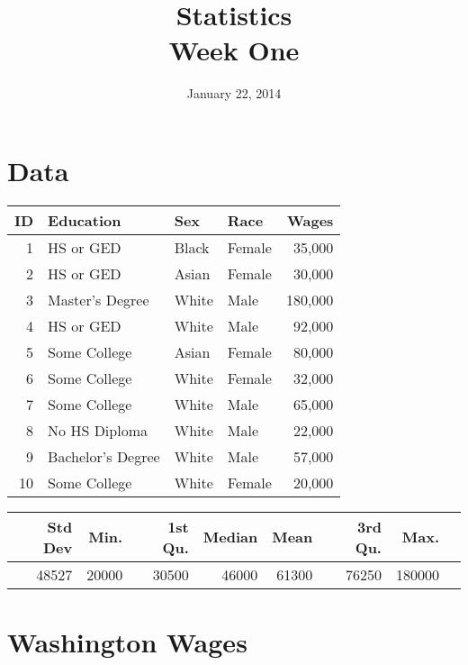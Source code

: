 \documentclass{exam}
\author{}
\date{January 22, 2014}
\title{Statistics \\ Week One}
\begin{document}
  \maketitle
  \tableofcontents

  \section{Data}

  \begin{table}[ht]
    \centering
    \begin{tabular}{rlllr}
      \toprule
        ID & Education         & Sex   & Race   & Wages \\
      \midrule
         1 & HS or GED         & Black & Female & 35,000 \\
         2 & HS or GED         & Asian & Female & 30,000 \\
         3 & Master's Degree   & White & Male   & 180,000 \\
         4 & HS or GED         & White & Male   & 92,000 \\
         5 & Some College      & Asian & Female & 80,000 \\
         6 & Some College      & White & Female & 32,000 \\
         7 & Some College      & White & Male   & 65,000 \\
         8 & No HS Diploma     & White & Male   & 22,000 \\
         9 & Bachelor's Degree & White & Male   & 57,000 \\
        10 & Some College      & White & Female & 20,000 \\
      \bottomrule
    \end{tabular}
  \end{table}

  \begin{table}[ht]
    \centering
    \begin{tabular}{rrrrrrrr}
      \toprule
        Std Dev & Min.  & 1st Qu. & Median & Mean  & 3rd Qu. & Max. \\
      \midrule
        48527   & 20000 & 30500   & 46000  & 61300 & 76250   & 180000 \\
      \bottomrule
    \end{tabular}
  \end{table}

  \section{Washington Wages}
\end{document}
